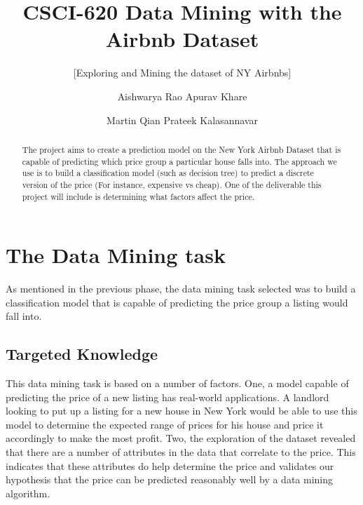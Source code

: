 \documentclass{sig-alternate}
\begin{document}
	\title{CSCI-620 Data Mining with the Airbnb Dataset}
	\subtitle{[Exploring and Mining the dataset of NY Airbnbs]}
	
	\author
	{
		\alignauthor
		Aishwarya Rao
		\alignauthor
		Apurav Khare
		\and
		\alignauthor
		Martin Qian
		\alignauthor
		Prateek Kalasannavar
	}
	
	\maketitle
	\begin{abstract}
		
		The project aims to create a prediction model on the New York Airbnb Dataset that is capable of predicting which price group a particular house falls into. The approach we use is to build a classification model (such as decision tree) to predict a discrete version of the price (For instance, expensive vs cheap). One of the deliverable this project will include is determining what factors affect the price.   
		
	\end{abstract}
	
	
	\section{The Data Mining task}
	As mentioned in the previous phase, the data mining task selected was to build a classification model that is capable of predicting the price group a listing would fall into.
	
	\subsection{Targeted Knowledge}
	This data mining task is based on a number of factors. One, a model capable of predicting the price of a new listing has real-world applications. A landlord looking to put up a listing for a new house in New York would be able to use this model to determine the expected range of prices for his house and price it accordingly to make the most profit. Two, the exploration of the dataset revealed that there are a number of attributes in the data that correlate to the price. This indicates that these attributes do help determine the price and validates our hypothesis that the price can be predicted reasonably well by a data mining algorithm. 
	
\end{document}
